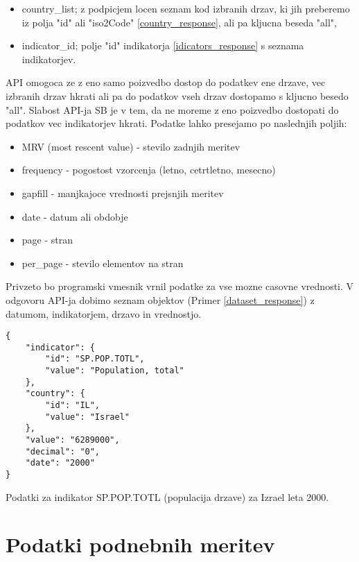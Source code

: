 \begin{itemize}
\item country\_list; z podpicjem locen seznam kod izbranih drzav, ki jih 
	  preberemo iz polja "id" ali "iso2Code" \ref{country_response}, ali pa 
      kljucna beseda "all",
\item indicator\_id; polje "id" indikatorja \ref{idicators_response} s seznama
      indikatorjev.
\end{itemize}

API omogoca ze z eno samo poizvedbo dostop do podatkev ene drzave, vec izbranih 
drzav hkrati ali pa do podatkov vseh drzav dostopamo s kljucno besedo "all".
Slabost API-ja SB je v tem, da ne moreme z eno poizvedbo dostopati do podatkov
vec indikatorjev hkrati. Podatke lahko presejamo po naslednjih poljih:
\begin{itemize}  
\item MRV (most rescent value) - stevilo zadnjih meritev
\item frequency - pogostost vzorcenja (letno, cetrtletno, mesecno)
\item gapfill - manjkajoce vrednosti prejsnjih meritev
\item date - datum ali obdobje
\item page - stran
\item per\_page - stevilo elementov na stran
\end{itemize}

Privzeto bo programski vmesnik vrnil podatke za vse mozne casovne 
vrednosti. V odgovoru API-ja dobimo seznam objektov (Primer
\ref{dataset_response}) z datumom, indikatorjem, drzavo in vrednostjo.


\begin{snippet}
\begin{center}
\begin{lstlisting}
{
    "indicator": {
        "id": "SP.POP.TOTL",
        "value": "Population, total"
    },
    "country": {
        "id": "IL",
        "value": "Israel"
    },
    "value": "6289000",
    "decimal": "0",
    "date": "2000"
}
\end{lstlisting}
\end{center}
\caption{Podatki za indikator SP.POP.TOTL (populacija drzave) za Izrael leta
2000.}
\label{dataset_response}
\end{snippet} 


\section{Podatki podnebnih meritev}

